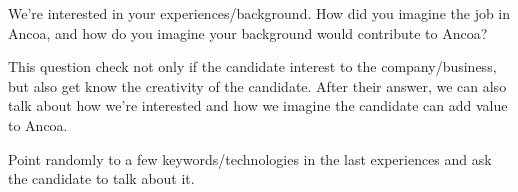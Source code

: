 \documentclass{exam}%
\newcommand*{\ANCOACPP}{}%
\begin{document}
\begin{questions}
\question We're interested in your experiences/background. How did you imagine the job in Ancoa, and how do you imagine your background would contribute to Ancoa?
\begin{solution}[.2in]
	This question check not only if the candidate interest to the company/business, but also get know the creativity of the candidate. After their answer, we can also talk about how we're interested and how we imagine the candidate can add value to Ancoa.
\end{solution}

\question Point randomly to a few keywords/technologies in the last experiences and ask the candidate to talk about it.

\end{questions}
\fi

\ifdefined\ANCOACPP
\end{document}

